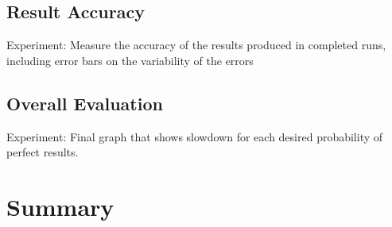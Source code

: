 \documentclass[prodmode,acmtecs]{acmconf} %
\begin{document}
\subsection{Result Accuracy}
\label{sec:eval:acc}

Experiment: Measure the accuracy of the results produced in completed runs, including error bars on the variability of the errors

\subsection{Overall Evaluation}
\label{sec:eval:overall}

Experiment: Final graph that shows slowdown for each desired probability of perfect results.

\section{Summary}
\label{sec:summary}
\end{document}
